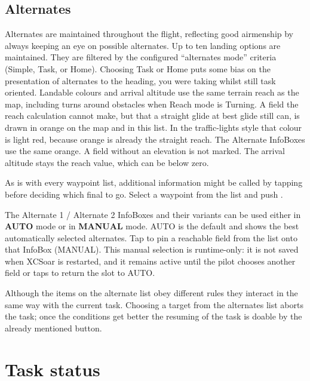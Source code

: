 \subsection*{Alternates}\label{sec:alternates}
Alternates are maintained throughout the flight, reflecting good airmenship by
always keeping an eye on possible alternates. Up to ten landing
options are maintained. They are filtered by the configured ``alternates mode''
criteria (Simple, Task, or Home). 
Choosing Task or Home puts some bias on the presentation of alternates to the
heading, you were taking whilst still task oriented.
Landable colours and arrival altitude use the same terrain reach as the
map, including turns around obstacles when Reach mode is Turning.
A field the reach calculation cannot make, but that a straight glide at
best glide still can, is drawn in orange on the map and in this list.
In the traffic-lights style that colour is light red, because orange is
already the straight reach. The Alternate InfoBoxes use the same orange.
A field without an elevation is not marked. The arrival altitude stays
the reach value, which can be below zero.

As is with every waypoint list, additional information might be called by tapping  before deciding which final to go. Select a waypoint from the list and push .

The Alternate 1 / Alternate 2 InfoBoxes and their variants can be used either
in \textbf{AUTO} mode or in \textbf{MANUAL} mode. AUTO is the default and
shows the best automatically selected alternates. Tap 
to pin a reachable field from the list onto that InfoBox (MANUAL). This
manual selection is runtime-only: it is not saved when XCSoar is
restarted, and it remains active until the pilot chooses another field or
taps  to return the slot to AUTO.

Although the items on the alternate list obey different rules they interact
in the same way
with the current task. Choosing a target from the alternates list aborts the task;
once the conditions get better the resuming of the task is doable by the already
mentioned button.


\section{Task status}\label{sec:task-status}

